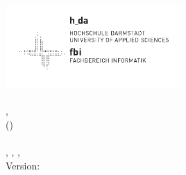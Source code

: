 \begin{titlingpage}
	\vspace*{0cm}
	\sffamily 
	\begin{centering}
		\includegraphics[width=0.5\textwidth]{images/fbi_logo.pdf} \\
		\vspace{2.5cm}
		\Huge
			\textbf{\docType} \\
		\vspace{1cm}
		\normalsize
			\docCourse, \docCourseSemester \\
		\small
			(\textit{\docCourseProf}) \\
		\vspace{3cm}
		\LARGE
			\docTypeRubric \\
		\vspace{4cm}
		\normalsize
			\ifde
			\else
			\fi
		\vspace{1cm}	
		\large
			\docStudentA, \docStudentB, \docStudentC, \docStudentD \\
			\vspace{1cm}
		\normalsize
			\docDate \hspace{1cm} Version: \docVersion \\
	\end{centering}
	
\end{titlingpage}

